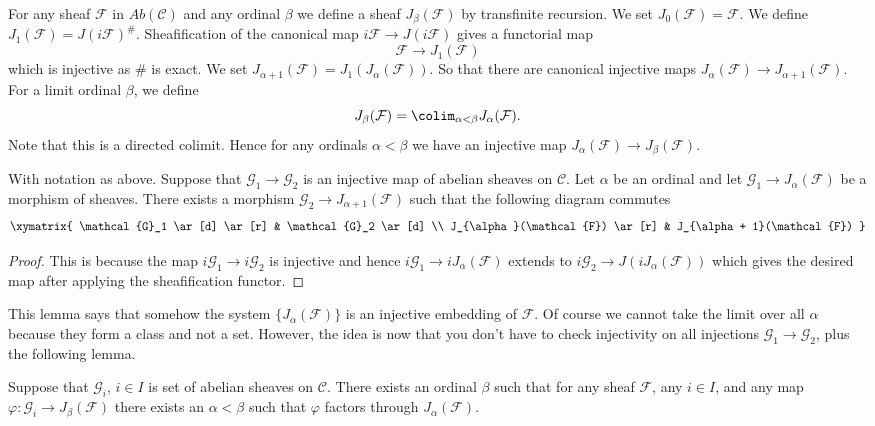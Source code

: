 \medskip\noindent
For any sheaf $\mathcal{F}$ in $\textit{Ab}(\mathcal{C})$ and
any ordinal $\beta$ we define a sheaf
$J_\beta(\mathcal{F})$ by transfinite recursion.
We set $J_0(\mathcal{F}) = \mathcal{F}$.
We define $J_1(\mathcal{F}) = J(i\mathcal{F})^\#$.
Sheafification of the canonical map $i\mathcal{F} \to J(i\mathcal{F})$
gives a functorial map
$$
\mathcal{F} \longrightarrow J_1(\mathcal{F})
$$
which is injective as $\#$ is exact. We set
$J_{\alpha + 1}(\mathcal{F}) = J_1(J_\alpha(\mathcal{F}))$.
So that there are canonical injective maps
$J_\alpha(\mathcal{F}) \to J_{\alpha + 1}(\mathcal{F})$.
For a limit ordinal $\beta$, we define
$$
J_\beta(\mathcal{F}) = \colim_{\alpha < \beta} J_\alpha(\mathcal{F}).
$$
Note that this is a directed colimit. Hence for any ordinals $\alpha < \beta$
we have an injective map $J_\alpha(\mathcal{F}) \to J_\beta(\mathcal{F})$.

\begin{lemma}
\label{lemma-map-into-next-one}
With notation as above.
Suppose that $\mathcal{G}_1 \to \mathcal{G}_2$ is an injective
map of abelian sheaves on $\mathcal{C}$. Let $\alpha$ be an ordinal
and let $\mathcal{G}_1 \to J_\alpha(\mathcal{F})$ be a morphism
of sheaves. There exists a morphism $\mathcal{G}_2 \to
J_{\alpha + 1}(\mathcal{F})$ such that the following diagram commutes
$$
\xymatrix{
\mathcal{G}_1 \ar[d] \ar[r] & \mathcal{G}_2 \ar[d] \\
J_{\alpha}(\mathcal{F}) \ar[r] & J_{\alpha + 1}(\mathcal{F}) }
$$
\end{lemma}

\begin{proof}
This is because the map $i\mathcal{G}_1 \to i\mathcal{G}_2$ is injective
and hence $i\mathcal{G}_1 \to iJ_\alpha(\mathcal{F})$ extends to
$i\mathcal{G}_2 \to J(iJ_\alpha(\mathcal{F}))$ which gives the
desired map after applying the sheafification functor.
\end{proof}

\noindent
This lemma says that somehow the system $\{J_{\alpha}(\mathcal{F})\}$
is an injective embedding of $\mathcal{F}$. Of course
we cannot take the limit over all $\alpha$ because they form a class
and not a set. However, the idea is now that you don't have to check
injectivity on all injections $\mathcal{G}_1 \to \mathcal{G}_2$, plus
the following lemma.

\begin{lemma}
\label{lemma-map-into-smaller}
Suppose that $\mathcal{G}_i$, $i\in I$ is set of abelian sheaves
on $\mathcal{C}$. There exists an ordinal $\beta$ such that
for any sheaf $\mathcal{F}$, any $i\in I$, and any map
$\varphi : \mathcal{G}_i \to J_\beta(\mathcal{F})$ there exists an
$\alpha < \beta$ such that $ \varphi $ factors through
$J_\alpha(\mathcal{F})$.
\end{lemma}


